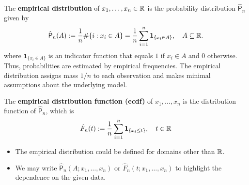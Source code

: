 




 The \textbf{empirical distribution} of \(x_1,\dots ,x_{n} \in \mathbb{R}\) is the probability distribution \(\hat{\mathsf{P}}_{n}\) given by \[
     \hat{\mathsf{P}}_{n}(A) := \frac{1}{n}\#\{i : x_{i} \in A \} = \frac{1}{n} \sum\limits_{i=1}^{n} \boldsymbol{1}_{\{x_{i}\in A \}}, \quad A \subseteq \mathbb{R}. 
 \]
where $\mathbf{1}_{\{x_i \in A\}}$ is an indicator function that equals $1$ if $x_i \in A$
and $0$ otherwise. Thus, probabilities are estimated by empirical frequencies.
The empirical distribution assigns mass $1/n$ to each observation and makes minimal assumptions
about the underlying model.


The \textbf{empirical distribution function (ecdf)} of \(x_1,\dots ,x_{n}\) is the distribution function of \(\hat{\mathsf{P}}_{n}\), which is \[
    \hat{F}_{n}(t) := \frac{1}{n}\sum\limits_{i=1}^{n} \boldsymbol{1}_{\{x_{i}\le t\}}, \quad t \in \mathbb{R} 
\]

\begin{remark}[]
\leavevmode
    \begin{itemize}
        \item The empirical distribution could be defined for domains other than \(\mathbb{R}\).
        \item We may write \(\hat{\mathsf{P}}_{n}(A;x_1,\dots ,x_{n})\) or \(\hat{F}_{n}(t;x_1,\dots ,x_{n})\) to highlight the dependence on the given data.
    \end{itemize}
\end{remark}
%
\label{par:Example of an Empirical CDF}

